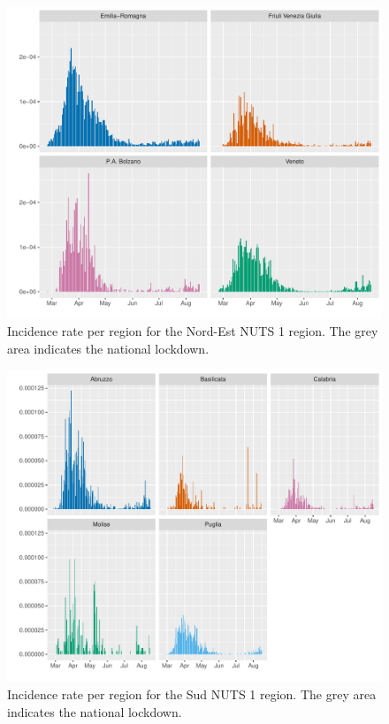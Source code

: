 \documentclass[12pt]{article}
\begin{document}
\begin{appendices}
    	\begin{figure}[H]
    	    \centering
    	    \includegraphics[width=0.94\linewidth]{output/infective_rates_Nord-Est.pdf}
    	    \caption{Incidence rate per region for the Nord-Est NUTS 1 region. The grey area indicates the national lockdown.}
    	    \label{fig:incidence_nordest}
    	\end{figure}
    	
    	\begin{figure}[H]
    	    \centering
    	    \includegraphics[width=0.94\linewidth]{output/infective_rates_Sud.pdf}
    	    \caption{Incidence rate per region for the Sud NUTS 1 region. The grey area indicates the national lockdown.}
    	    \label{fig:incidence_sud}
    	\end{figure}
    	

\end{appendices}
\end{document}
